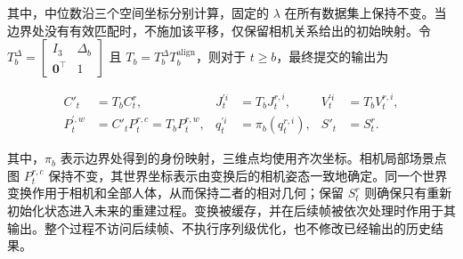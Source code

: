 其中，中位数沿三个空间坐标分别计算，固定的 $\lambda$ 在所有数据集上保持不变。当边界处没有有效匹配时，不施加该平移，仅保留相机关系给出的初始映射。令
$T_b^\Delta=\begin{bmatrix}I_3&\Delta_b\\\mathbf 0^\top&1\end{bmatrix}$ 且
$T_b=T_b^\Delta T_b^{\mathrm{align}}$，则对于 $t\geq b$，最终提交的输出为

\begin{equation}
\begin{aligned}
 C'_t&=T_bC_t^r, &
 J_t^{\prime i}&=T_bJ_t^{r,i}, &
 V_t^{\prime i}&=T_bV_t^{r,i},\\
 P_t^{\prime,w}&=C'_tP_t^{r,c}=T_bP_t^{r,w}, &
 q_t^{\prime i}&=\pi_b(q_t^{r,i}), &
 S'_t&=S_t^r.
\end{aligned}
\label{eq:shared-world-transform-zh}
\end{equation}

其中，$\pi_b$ 表示边界处得到的身份映射，三维点均使用齐次坐标。相机局部场景点图 $P_t^{r,c}$ 保持不变，其世界坐标表示由变换后的相机姿态一致地确定。同一个世界变换作用于相机和全部人体，从而保持二者的相对几何；保留 $S_t^r$ 则确保只有重新初始化状态进入未来的重建过程。变换被缓存，并在后续帧被依次处理时作用于其输出。整个过程不访问后续帧、不执行序列级优化，也不修改已经输出的历史结果。
